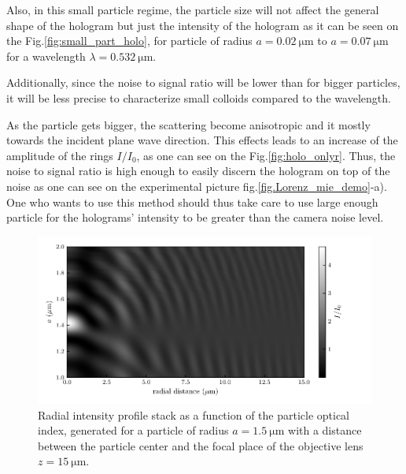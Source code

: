  Also, in this small particle regime, the particle size will not affect the general shape of the hologram but just the intensity of the hologram as it can be seen on the Fig.\ref{fig:small_part_holo}, for particle of radius $a = 0.02 ~\mathrm{\mu m}$ to $a = 0.07 ~\mathrm{\mu m}$ for a wavelength $\lambda = 0.532 ~\mathrm{\mu m}$.
 
  Additionally, since the noise to signal ratio will be lower than for bigger particles, it will be less precise to characterize small colloids compared to the wavelength.





 As the particle gets bigger, the scattering become anisotropic and it mostly towards the incident plane wave direction. This effects leads to an increase of the amplitude of the rings $I/I_0$, as one can see on the Fig.\ref{fig:holo_onlyr}. Thus, the noise to signal ratio is high enough to easily discern the hologram on top of the noise as one can see on the experimental picture fig.\ref{fig.Lorenz_mie_demo}-a). One who wants to use this method should thus take care to use large enough particle for the holograms' intensity to be greater than the camera noise level.









\begin{figure}[H]
	\centering
	\includegraphics{02_body/chapter2/images/holo_size_exemple/holos_only_n.pdf}
	\caption{Radial intensity profile stack as a function of the particle optical index, generated for a particle of radius $a = 1.5 ~ \mathrm{\mu m}$ with a distance between the particle center and the focal place of the objective lens $z = 15 ~\mathrm{\mu m}$.}
	\label{fig:holo_onlyn}
\end{figure}


